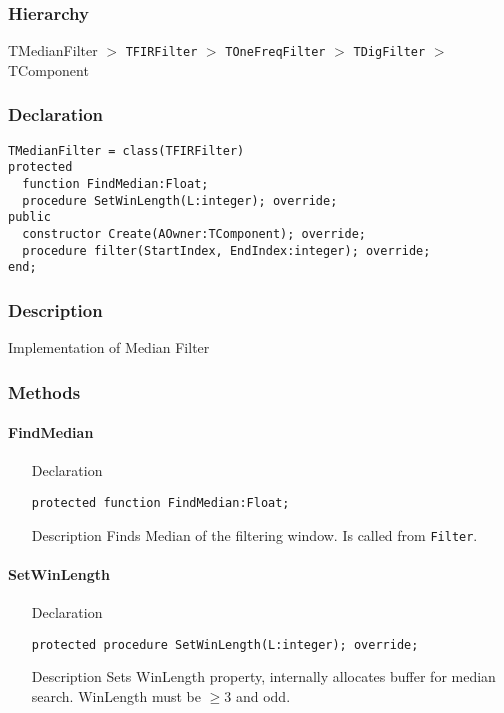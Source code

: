 \documentclass[12pt,a4paper,oneside]{report}
\newcommand{\declarationitem}[1]{{\addfontfeatures{FakeBold=1.3} #1}}
\newcommand{\descriptiontitle}[1]{{\addfontfeatures{FakeSlant}#1}}
\newcommand{\code}[1]{\texttt{#1}}
\begin{document}
\subsubsection{Hierarchy}
TMedianFilter {$>$} \code{TFIRFilter} {$>$} \code{TOneFreqFilter} {$>$} \code{TDigFilter} {$>$} TComponent
\subsubsection{Declaration}
\begin{verbatim}
TMedianFilter = class(TFIRFilter)
protected
  function FindMedian:Float;
  procedure SetWinLength(L:integer); override;
public
  constructor Create(AOwner:TComponent); override;
  procedure filter(StartIndex, EndIndex:integer); override;
end;
\end{verbatim}
\subsubsection{Description}
Implementation of Median Filter
\subsubsection{Methods}
\paragraph{FindMedian}\hspace*{\fill}
\label{lmfilters.TMedianFilter-FindMedian}
\begin{itemize}\item[\declarationitem{Declaration}\hfill]
	\begin{flushleft}
		\code{protected function FindMedian:Float;}
	\end{flushleft}
\item[\descriptiontitle{Description}] Finds Median of the filtering window. Is called from \code{Filter}.
\end{itemize}
\paragraph{SetWinLength}\hspace*{\fill}
\label{lmfilters.TMedianFilter-SetWinLength}
\begin{itemize}\item[\declarationitem{Declaration}\hfill]
	\begin{flushleft}
		\code{protected procedure SetWinLength(L:integer); override;}
	\end{flushleft}
\item[\descriptiontitle{Description}] Sets WinLength property, internally allocates buffer for median search. WinLength must be $\ge 3$ and odd.
\end{itemize}
\end{document}
